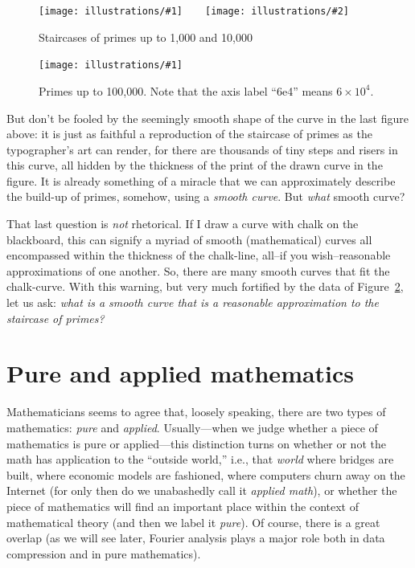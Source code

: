 \documentclass[openany]{book}
\newcommand{\ill}[3]{%
   \begin{figure}[H]%
   \vspace{-2ex}
   \centering%
   \texttt{[image: illustrations/\#1]}%
   \caption{#3}%
   \vspace{-2ex}
    \end{figure}}
\newcommand{\illtwo}[4]{%
   \begin{figure}[H]\centering%
   \texttt{[image: illustrations/\#1]}$\qquad$\texttt{[image: illustrations/\#2]}%
   \caption{#4}%
    \end{figure}}
\theoremstyle{plain}
\theoremstyle{definition}
\begin{document}
\illtwo{prime_pi_1000}{prime_pi_10000}{0.4}{Staircases of primes up to 1,000 and 10,000\label{fig:staircases2}}

\ill{prime_pi_100000}{.8}{Primes up to 100,000\label{fig:pn100000}.
Note that the axis label ``6e4'' means $6 \times 10^4$.}



But don't be fooled by the seemingly smooth shape of the curve in the
last figure above: it is just as faithful a reproduction of the
staircase of primes as the typographer's art can render, for there are
thousands of tiny steps and risers in this curve, all hidden by the
thickness of the print of the drawn curve in the figure.  It is
already something of a miracle that we can approximately describe the
build-up of primes, somehow, using a {\em smooth curve}.  But {\em
  what} smooth curve?


That last question is {\em not} rhetorical. If I draw a curve with
chalk on the blackboard, this can signify a myriad of smooth
(mathematical) curves all encompassed within the thickness of the
chalk-line, all--if you wish--reasonable approximations of one
another. So, there are many smooth curves that fit the chalk-curve.
With this warning, but very much fortified by the data of Figure~\ref{fig:pn100000},
let us ask: {\em what is a smooth curve that is a reasonable
  approximation to the staircase of primes?}

\chapter{Pure and applied  mathematics}\label{ch:pureapplied}

Mathematicians seems to agree that, loosely speaking, there are two
types of mathematics: {\em pure} and {\em applied}. Usually---when we
judge whether a piece of mathematics is pure or applied---this
distinction turns on whether or not the math has application to the
``outside world,'' i.e., that {\em world} where bridges are built,
where economic models are fashioned, where computers churn away on the
Internet (for only then do we unabashedly call it {\em applied math}),
or whether the piece of mathematics will find an important place
within the context of mathematical theory (and then we label it {\em
  pure}).  Of course, there is a great overlap (as we will see later,
Fourier analysis plays a major role both in data compression and in
pure mathematics).
\end{document}

